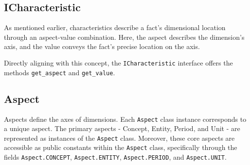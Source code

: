 \subsection{ICharacteristic}

As mentioned earlier, characteristics describe a fact's dimensional location through an aspect-value combination.
Here, the aspect describes the dimension's axis, and the value conveys the fact's precise location on the axis.

Directly aligning with this concept, 
the \texttt{ICharacteristic} interface offers the methods \texttt{get\_aspect} and \texttt{get\_value}.

\subsection{Aspect}



Aspects define the axes of dimensions.
Each \texttt{Aspect} class instance corresponds to a unique aspect.
The primary aspects - Concept, Entity, Period, and Unit - are represented as instances of the \texttt{Aspect} class.
Moreover, these core aspects are accessible as public constants within the \texttt{Aspect} class,
specifically through the fields \texttt{Aspect.CONCEPT}, \texttt{Aspect.ENTITY}, \texttt{Aspect.PERIOD}, and \texttt{Aspect.UNIT}.

